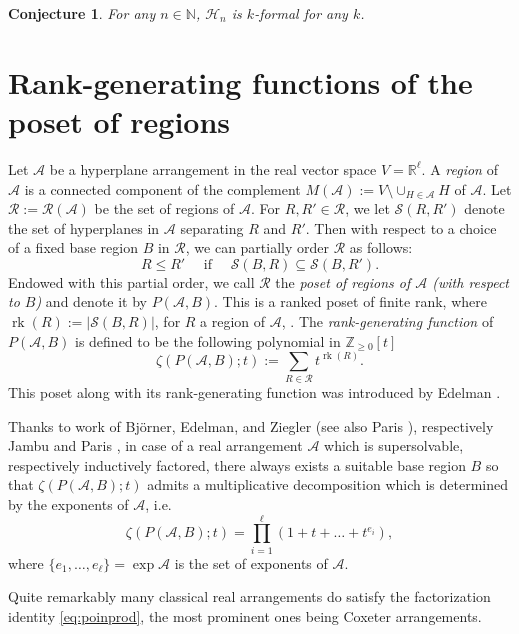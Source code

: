 \documentclass[12pt]{amsart}
\newcommand\CA{{\mathscr A}}
\newcommand\CH{{\mathscr H}}
\newcommand\CS{{\mathcal S}}
\newcommand\RR{{\mathscr R}}
\newcommand\BBN{{\mathbb N}}
\newcommand\BBR{{\mathbb R}}
\newcommand\BBZ{{\mathbb Z}}
\newcommand\rk{\operatorname{rk}}
\numberwithin{equation}{section}
\theoremstyle{plain}
\newtheorem{conjecture}[equation]{Conjecture}
\theoremstyle{definition}
\begin{document}
\begin{conjecture}
	For any $n \in \BBN$, $\CH_n$ is $k$-formal for any $k$.
\end{conjecture}


\section{Rank-generating functions of the poset of regions}
\label{s:rankgenerating}

Let $\CA$ be a 
hyperplane arrangement in the real vector space $V=\BBR^\ell$. 
A \emph{region} of $\CA$ is a connected component of the 
complement $M(\CA) := V \setminus \cup_{H \in \CA}H$ of $\CA$.
Let $\RR := \RR(\CA)$ be the set of regions of $\CA$.
For $R, R' \in \RR$, we let $\CS(R,R')$ denote the 
set of hyperplanes in $\CA$ separating $R$ and $R'$.
Then with respect to a choice of a fixed 
base region $B$ in $\RR$, we can partially order
$\RR$ as follows:
\[
R \le R' \quad \text{ if } \quad \CS(B,R) \subseteq \CS(B,R').
\]
Endowed with this partial order, we call $\RR$ the
\emph{poset of regions of $\CA$ (with respect to $B$)} and denote it by
$P(\CA, B)$. This is a ranked poset of finite rank,
where $\rk(R) := |\CS(B,R)|$, for $R$ a region of $\CA$, 
\cite[Prop.\ 1.1]{edelman:regions}.
The \emph{rank-generating function} of $P(\CA, B)$ is 
defined to be the following polynomial in 
$\BBZ_{\ge 0}[t]$
\begin{equation*}
	\label{eq:rankgen}
	\zeta(P(\CA,B); t) := \sum_{R \in \RR}t^{\rk(R)}. 
\end{equation*}
This poset along with its rank-generating function
was introduced by Edelman 
\cite{edelman:regions}.

Thanks to work of  Bj\"orner, Edelman, and Ziegler 
\cite[Thm.~4.4]{bjoerneredelmanziegler}
(see also Paris \cite{paris:counting}), respectively  
Jambu and Paris \cite[Prop.~3.4, Thm.~6.1]{jambuparis:factored},
in case of a real arrangement $\CA$  
which is supersolvable, 
respectively inductively factored, 
there always exists a suitable base region $B$ so that 
$\zeta(P(\CA,B); t)$
admits a multiplicative decomposition which 
is determined by the exponents of $\CA$, i.e.
	\begin{equation}
	\label{eq:poinprod}
	\zeta(P(\CA,B); t) = \prod_{i=1}^\ell (1 + t + \ldots + t^{e_i}),
\end{equation}
	where $\{e_1, \ldots, e_\ell\} = \exp \CA$ is the 
set of exponents of $\CA$.

Quite remarkably
many classical real arrangements do satisfy the
factorization identity \eqref{eq:poinprod}, 
the most prominent ones being Coxeter arrangements.
\end{document}
